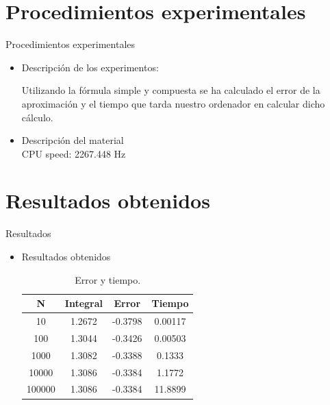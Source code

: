\documentclass{beamer}
\begin{document}
\section{Procedimientos experimentales}
\begin{frame}{Procedimientos experimentales}
 \begin{itemize}
   \item Descripción de los experimentos:
    
    \parindent=0.5cm Utilizando la fórmula simple y compuesta se ha calculado el error de la aproximación y el tiempo que tarda nuestro ordenador en calcular dicho cálculo.
   \item Descripción del material\\
    CPU speed: 2267.448 Hz
 \end{itemize}
\end{frame}

\section{Resultados obtenidos}
\begin{frame}{Resultados}
  \begin{itemize}
    \item Resultados obtenidos \\
      \begin{table}
	\centering
	\begin{tabular}{||c|c c c||}
	  \hline
	  \hline
	  N & Integral & Error & Tiempo  \\
	  \hline
	  10     & 1.2672   & -0.3798 & 0.00117  \\
	  100    & 1.3044   & -0.3426 & 0.00503  \\
	  1000   & 1.3082   & -0.3388 & 0.1333   \\
	  10000  & 1.3086   & -0.3384 & 1.1772   \\
	  100000 & 1.3086   & -0.3384 & 11.8899  \\
	  \hline
	  \hline
	\end{tabular}
	\caption{\label{tab:widgets}Error y tiempo.}
     \end{table}
  \end{itemize}
\end{frame}
\end{document}
